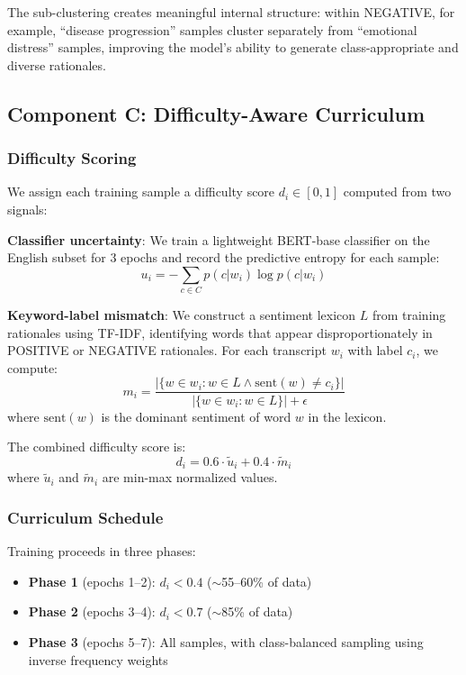 \documentclass[conference]{IEEEtran}
\begin{document}
The sub-clustering creates meaningful internal structure: within NEGATIVE, for example, ``disease progression'' samples cluster separately from ``emotional distress'' samples, improving the model's ability to generate class-appropriate and diverse rationales.

\subsection{Component C: Difficulty-Aware Curriculum}

\subsubsection{Difficulty Scoring}

We assign each training sample a difficulty score $d_i \in [0, 1]$ computed from two signals:

\textbf{Classifier uncertainty}: We train a lightweight BERT-base classifier on the English subset for 3 epochs and record the predictive entropy for each sample:
\begin{equation}
    u_i = -\sum_{c \in C} p(c | w_i) \log p(c | w_i)
\end{equation}

\textbf{Keyword-label mismatch}: We construct a sentiment lexicon $L$ from training rationales using TF-IDF, identifying words that appear disproportionately in POSITIVE or NEGATIVE rationales. For each transcript $w_i$ with label $c_i$, we compute:
\begin{equation}
    m_i = \frac{|\{w \in w_i : w \in L \wedge \text{sent}(w) \neq c_i\}|}{|\{w \in w_i : w \in L\}| + \epsilon}
\end{equation}
where $\text{sent}(w)$ is the dominant sentiment of word $w$ in the lexicon.

The combined difficulty score is:
\begin{equation}
    d_i = 0.6 \cdot \tilde{u}_i + 0.4 \cdot \tilde{m}_i
\end{equation}
where $\tilde{u}_i$ and $\tilde{m}_i$ are min-max normalized values.

\subsubsection{Curriculum Schedule}

Training proceeds in three phases:
\begin{itemize}
    \item \textbf{Phase 1} (epochs 1--2): $d_i < 0.4$ ($\sim$55--60\% of data)
    \item \textbf{Phase 2} (epochs 3--4): $d_i < 0.7$ ($\sim$85\% of data)
    \item \textbf{Phase 3} (epochs 5--7): All samples, with class-balanced sampling using inverse frequency weights
\end{itemize}
\end{document}

